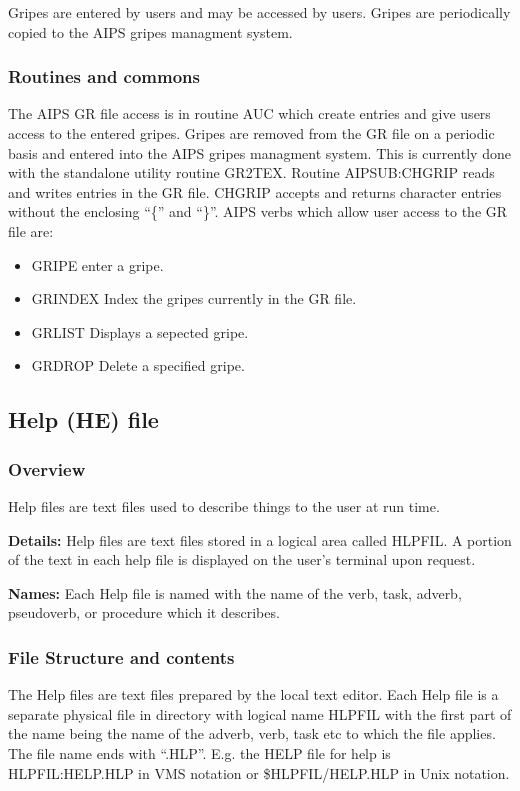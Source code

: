      Gripes are entered by users and may be accessed by users.  Gripes
are periodically copied to the AIPS gripes managment system.

\subsubsection{Routines and commons}
   The AIPS GR file access is in routine AUC which create entries and
give users access to the entered gripes.  Gripes are removed from the
GR file on a periodic basis and entered into the AIPS gripes managment
system.  This is currently done with the standalone utility routine
GR2TEX. Routine AIPSUB:CHGRIP reads and writes entries in the GR file.
CHGRIP accepts and returns character entries without the enclosing
``\{'' and ``\}''.
     AIPS verbs which allow user access to the GR file are:

\begin{itemize}
\item GRIPE enter a gripe.
\item GRINDEX Index the gripes currently in the GR file.
\item GRLIST Displays a sepected gripe.
\item GRDROP Delete a specified gripe.
\end{itemize}

\subsection{Help (HE) file}
\subsubsection{Overview}

  Help files are text files used to describe things to the
user at run time.

{\bf Details:} Help files are text files stored in a logical area
called HLPFIL.  A portion of the text in each help file is displayed on
the user's terminal upon request.

{\bf Names:}  Each Help file is named with the name of the verb, task,
adverb, pseudoverb, or procedure which it describes.


\subsubsection{File Structure and contents}


     The Help files are text files prepared by the local text editor.
Each Help file is a separate physical file in directory with logical
name HLPFIL with the first part of the name being the name of the
adverb, verb, task etc to which the file applies.  The file name ends
with ``.HLP''.  E.g. the HELP file for help is HLPFIL:HELP.HLP in VMS
notation or \$HLPFIL/HELP.HLP in Unix notation.

